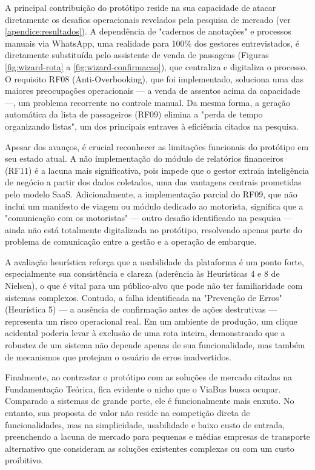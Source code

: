 A principal contribuição do protótipo reside na sua capacidade de atacar diretamente os desafios operacionais revelados pela pesquisa de mercado (ver \autoref{apendice:resultados}). A dependência de "cadernos de anotações" e processos manuais via WhatsApp, uma realidade para 100\% dos gestores entrevistados, é diretamente substituída pelo assistente de venda de passagens (Figuras \ref{fig:wizard-rota} a \ref{fig:wizard-confirmacao}), que centraliza e digitaliza o processo. O requisito RF08 (Anti-Overbooking), que foi implementado, soluciona uma das maiores preocupações operacionais — a venda de assentos acima da capacidade —, um problema recorrente no controle manual. Da mesma forma, a geração automática da lista de passageiros (RF09) elimina a "perda de tempo organizando listas", um dos principais entraves à eficiência citados na pesquisa.

Apesar dos avanços, é crucial reconhecer as limitações funcionais do protótipo em seu estado atual. A não implementação do módulo de relatórios financeiros (RF11) é a lacuna mais significativa, pois impede que o gestor extraia inteligência de negócio a partir dos dados coletados, uma das vantagens centrais prometidas pelo modelo SaaS. Adicionalmente, a implementação parcial do RF09, que não inclui um manifesto de viagem ou módulo dedicado ao motorista, significa que a "comunicação com os motoristas" — outro desafio identificado na pesquisa — ainda não está totalmente digitalizada no protótipo, resolvendo apenas parte do problema de comunicação entre a gestão e a operação de embarque.

A avaliação heurística reforça que a usabilidade da plataforma é um ponto forte, especialmente sua consistência e clareza (aderência às Heurísticas 4 e 8 de Nielsen), o que é vital para um público-alvo que pode não ter familiaridade com sistemas complexos. Contudo, a falha identificada na "Prevenção de Erros" (Heurística 5) — a ausência de confirmação antes de ações destrutivas — representa um risco operacional real. Em um ambiente de produção, um clique acidental poderia levar à exclusão de uma rota inteira, demonstrando que a robustez de um sistema não depende apenas de sua funcionalidade, mas também de mecanismos que protejam o usuário de erros inadvertidos.

Finalmente, ao contrastar o protótipo com as soluções de mercado citadas na Fundamentação Teórica, fica evidente o nicho que o ViaBus busca ocupar. Comparado a sistemas de grande porte, ele é funcionalmente mais enxuto. No entanto, sua proposta de valor não reside na competição direta de funcionalidades, mas na simplicidade, usabilidade e baixo custo de entrada, preenchendo a lacuna de mercado para pequenas e médias empresas de transporte alternativo que consideram as soluções existentes complexas ou com um custo proibitivo.